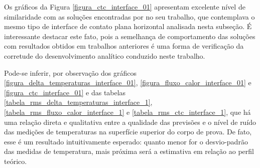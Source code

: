 Os gráficos da Figura \ref{figura_ctc_interface_01} apresentam excelente nível de similaridade com as soluções encontradas por \cite{tese_padilha} no seu trabalho, que contemplava o mesmo tipo de interface de contato plana horizontal analisada nesta subseção. É interessante destacar este fato, pois a semelhança de comportamento das soluções com resultados obtidos em trabalhos anteriores é uma forma de verificação da corretude do desenvolvimento analítico conduzido neste trabalho.

Pode-se inferir, por observação dos gráficos \ref{figura_delta_temperaturas_interface_01}, \ref{figura_fluxo_calor_interface_01} e \ref{figura_ctc_interface_01} e das tabelas \ref{tabela_rms_delta_temperaturas_interface_1}, \ref{tabela_rms_fluxo_calor_interface_1} e \ref{tabela_rms_ctc_interface_1}, que há uma relação direta e qualitativa entre a qualidade das previsões e o nível de ruído das medições de temperaturas na superfície superior do corpo de prova. De fato, esse é um resultado intuitivamente esperado: quanto menor for o desvio-padrão das medidas de temperatura, mais próxima será a estimativa em relação ao perfil teórico.